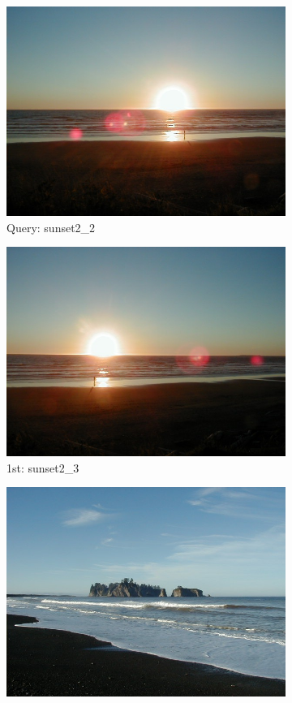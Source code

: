 \begin{itemize}
\begin{figure}[H]
	\centering
	\begin{subfigure}{0.25\textwidth}
	  \centering
	  \includegraphics[width=0.9\linewidth]{../input/sunset2_2.jpg}
	  \caption{Query: sunset2\_2}
	\end{subfigure}%
	\begin{subfigure}{0.25\textwidth}
	  \centering
	  \includegraphics[width=0.9\linewidth]{../input/sunset2_3.jpg}
	  \caption{1st: sunset2\_3}
	\end{subfigure}%
	\begin{subfigure}{0.25\textwidth}
        \centering
        \includegraphics[width=0.9\linewidth]{../input/beach_4.jpg}

\end{subfigure}
\end{figure}
\end{itemize}
